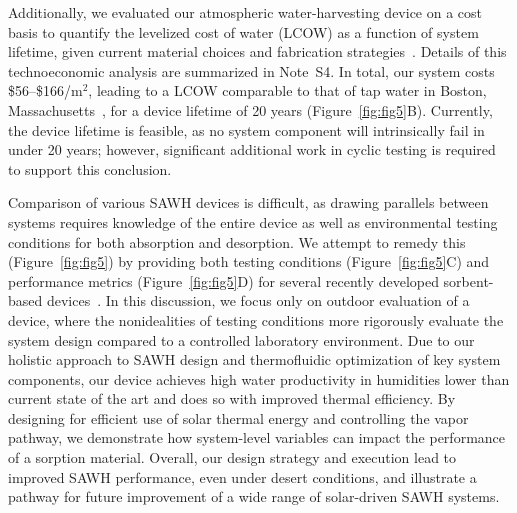 \documentclass[11pt]{article}
\begin{document}
Additionally, we evaluated our atmospheric water-harvesting device on a cost basis to quantify the levelized cost of water (LCOW) as a function of system lifetime, given current material choices and fabrication strategies~\cite{siegel2020}. Details of this technoeconomic analysis are summarized in Note~S4. In total, our system costs \$56--\$166/m$^2$, leading to a LCOW comparable to that of tap water in Boston, Massachusetts~\cite{bwsc2024}, for a device lifetime of 20 years (Figure~\ref{fig:fig5}B). Currently, the device lifetime is feasible, as no system component will intrinsically fail in under 20 years; however, significant additional work in cyclic testing is required to support this conclusion.

Comparison of various SAWH devices is difficult, as drawing parallels between systems requires knowledge of the entire device as well as environmental testing conditions for both absorption and desorption. We attempt to remedy this (Figure~\ref{fig:fig5}) by providing both testing conditions (Figure~\ref{fig:fig5}C) and performance metrics (Figure~\ref{fig:fig5}D) for several recently developed sorbent-based devices~\cite{xu2021,li2022,lapotin2021,shao2023,song2023,zhou2023}. In this discussion, we focus only on outdoor evaluation of a device, where the nonidealities of testing conditions more rigorously evaluate the system design compared to a controlled laboratory environment. Due to our holistic approach to SAWH design and thermofluidic optimization of key system components, our device achieves high water productivity in humidities lower than current state of the art and does so with improved thermal efficiency. By designing for efficient use of solar thermal energy and controlling the vapor pathway, we demonstrate how system-level variables can impact the performance of a sorption material. Overall, our design strategy and execution lead to improved SAWH performance, even under desert conditions, and illustrate a pathway for future improvement of a wide range of solar-driven SAWH systems.
\end{document}
